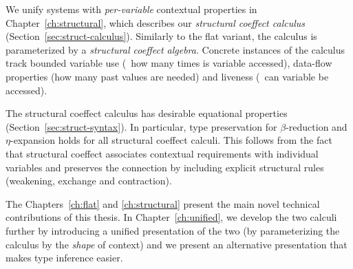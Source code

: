 We unify systems with \emph{per-variable} contextual properties in Chapter~\ref{ch:structural},
which describes our \emph{structural coeffect calculus} (Section~\ref{sec:struct-calculus}). 
Similarly to the flat variant, the calculus is parameterized by a \emph{structural coeffect algebra}. 
Concrete instances of the calculus track bounded variable use (\ie~how many times is variable 
accessed), data-flow properties (how many past values are needed) and liveness (\ie~can variable 
be accessed). 

The structural coeffect calculus has desirable equational properties (Section~\ref{sec:struct-syntax}).
In particular, type preservation for $\beta$-reduction and $\eta$-expansion holds for all structural
coeffect calculi. This follows from the fact that structural coeffect associates contextual requirements
with individual variables and preserves the connection by including explicit structural rules
(weakening, exchange and contraction).

The Chapters~\ref{ch:flat} and \ref{ch:structural} present the main novel technical contributions of this
thesis. In Chapter~\ref{ch:unified}, we develop the two calculi further by introducing a unified
presentation of the two (by parameterizing the calculus by the \emph{shape} of context) and we present
an alternative presentation that makes type inference easier.